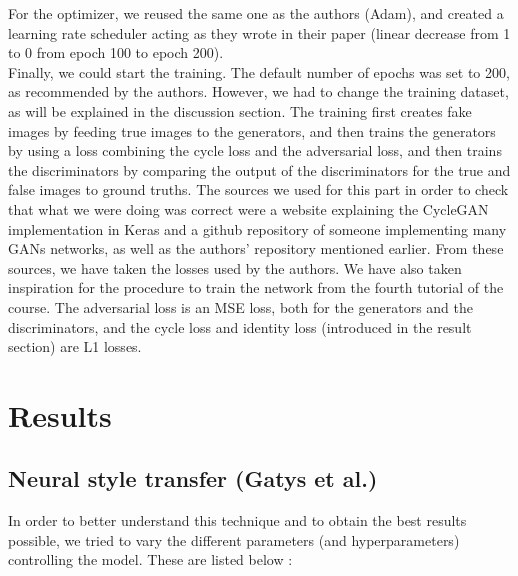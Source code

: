 \documentclass[twocolumn,superscriptaddress,aps,floatfix,nofootinbib]{revtex4-1}
\begin{document}
    For the optimizer, we reused the same one as the authors (Adam), and created a learning rate scheduler acting as they wrote in their paper (linear decrease from 1 to 0 from epoch 100 to epoch 200).\\
    
    Finally, we could start the training. The default number of epochs was set to 200, as recommended by the authors. However, we had to change the training dataset, as will be explained in the discussion section. The training first creates fake images by feeding true images to the generators, and then trains the generators by using a loss combining the cycle loss and the adversarial loss, and then trains the discriminators by comparing the output of the discriminators for the true and false images to ground truths. The sources we used for this part in order to check that what we were doing was correct were a website explaining the CycleGAN implementation in Keras\cite{keras} and a github repository of someone implementing many GANs networks\cite{erik}, as well as the authors' repository mentioned earlier. From these sources, we have taken the losses used by the authors. We have also taken inspiration for the procedure to train the network from the fourth tutorial of the course. The adversarial loss is an MSE loss, both for the generators and the discriminators, and the cycle loss and identity loss (introduced in the result section) are L1 losses.
    
    
    
    
    \section{Results}
    
    \subsection{Neural style transfer (Gatys et al.)}\label{sec:results.gatys}
    
    In order to better understand this technique and to obtain the best results possible, we tried to vary the different parameters (and hyperparameters) controlling the model. These are listed below :
    
\end{document}
